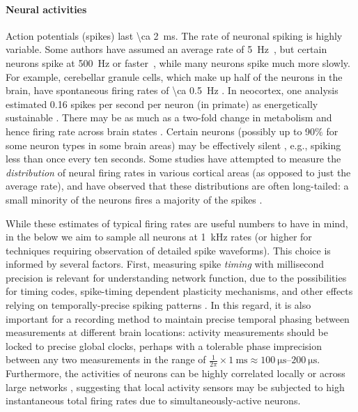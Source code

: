 \paragraph{Neural activities}
Action potentials (spikes) last \SI{\ca 2}{\milli\second}.
The rate of neuronal spiking is highly variable. Some authors have assumed an average rate of \SI{5}{\hertz}~\cite{sarpeshkar10, harris2012synaptic}, but certain neurons spike at \SI{500}{\hertz} or faster~\cite{gittis10}, while many neurons spike much more slowly. For example, cerebellar granule cells, which make up half of the neurons in the brain, have spontaneous firing rates of \SI{\ca 0.5}{\hertz} \cite{chadderton2004integration}. In neocortex, one analysis estimated 0.16 spikes per second per neuron (in primate) as energetically sustainable \cite{lennie2003cost}. There may be as much as a two-fold change in metabolism and hence firing rate across brain states \cite{howarth2012updated}. Certain neurons (possibly up to 90$\%$ for some neuron types in some brain areas) may be effectively silent \cite{Shoham2006, Barth2012345}, e.g., spiking less than once every ten seconds. Some studies have attempted to measure the \emph{distribution} of neural firing rates in various cortical areas (as opposed to just the average rate), and have observed that these distributions are often long-tailed: a small minority of the neurons fires a majority of the spikes \cite{roxin2011distribution, oconnor2010neural, hromadka2008sparse, shafi2007variability}. 

While these estimates of typical firing rates are useful numbers to have in mind, in the below we aim to sample all neurons at \SI{1}{\kilo\hertz} rates (or higher for techniques requiring observation of detailed spike waveforms). This choice is informed by several factors. First, measuring spike \emph{timing} with millisecond precision is relevant for understanding network function, due to the possibilities for timing codes, spike-timing dependent plasticity mechanisms, and other effects relying on temporally-precise spiking patterns \cite{markram2011history, Babadi2013, Taillefumier27032013, Gire2013416}. In this regard, it is also important for a recording method to maintain precise temporal phasing between measurements at different brain locations: activity measurements should be locked to precise global clocks, perhaps with a tolerable phase imprecision between any two measurements in the range of $\frac{1}{2\pi} \times \SI{1}{\milli\second} \approx \SIrange{100}{200}{\micro\second}$. Furthermore, the activities of neurons can be highly correlated locally or across large networks \cite{schneidman2006weak}, suggesting that local activity sensors may be subjected to high instantaneous total firing rates due to simultaneously-active neurons.

